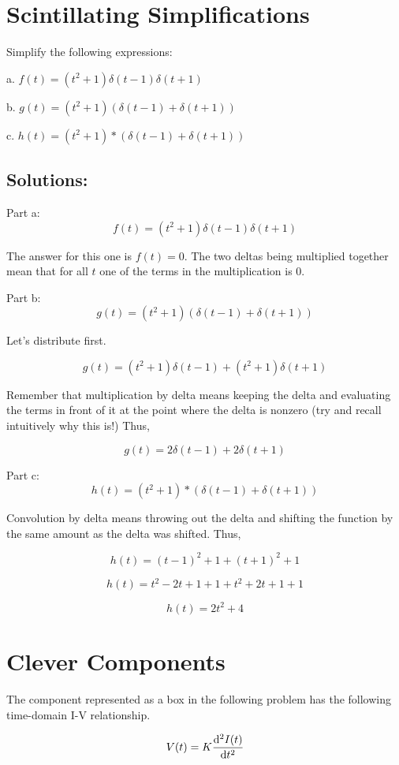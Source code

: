 \documentclass{article}
\begin{document}
\section{Scintillating Simplifications}

Simplify the following expressions:

a. $f(t) = (t^2 + 1)\delta(t - 1)\delta(t + 1)$

b. $g(t) = (t^2 + 1)(\delta(t - 1) + \delta(t + 1))$

c. $h(t) = (t^2 + 1) * (\delta(t - 1) + \delta(t + 1))$

\subsection{Solutions:}

Part a: $$f(t) = (t^2 + 1)\delta(t - 1)\delta(t + 1)$$

The answer for this one is $\boxed{f(t) = 0}$. The two deltas being multiplied together mean that for all $t$ one of the terms in the multiplication is 0.

Part b: $$g(t) = (t^2 + 1)(\delta(t - 1) + \delta(t + 1))$$

Let's distribute first.

$$g(t) = (t^2 + 1)\delta(t - 1) + (t^2 + 1)\delta(t + 1)$$

Remember that multiplication by delta means keeping the delta and evaluating the terms in front of it at the point where the delta is nonzero (try and recall intuitively why this is!) Thus,

$$\boxed{g(t) = 2\delta(t - 1) + 2 \delta(t + 1)}$$

Part c: $$h(t) = (t^2 + 1) * (\delta(t - 1) + \delta(t + 1))$$

Convolution by delta means throwing out the delta and shifting the function by the same amount as the delta was shifted. Thus,

$$h(t) = (t-1)^2 + 1 + (t+1)^2 + 1$$

$$h(t) = t^2 - 2t + 1 + 1 + t^2 + 2t + 1 + 1$$

$$\boxed{h(t) = 2t^2 + 4}$$
\newpage

\section{Clever Components} The component represented as a box in the following problem has the following time-domain I-V relationship.

\[
V(t) = K\dv[2]{I(t)}{t}
\]
\end{document}
